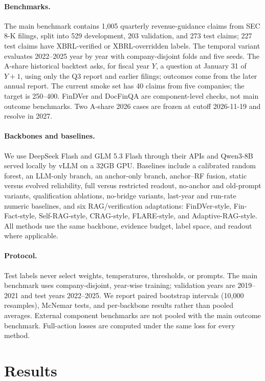 \documentclass[11pt]{article}
\begin{document}
\paragraph{Benchmarks.}
The main benchmark contains 1,005 quarterly revenue-guidance claims from SEC 8-K filings, split into 529 development, 203 validation, and 273 test claims; 227 test claims have XBRL-verified or XBRL-overridden labels. The temporal variant evaluates 2022--2025 year by year with company-disjoint folds and five seeds. The A-share historical backtest asks, for fiscal year $Y$, a question at January 31 of $Y+1$, using only the Q3 report and earlier filings; outcomes come from the later annual report. The current smoke set has 40 claims from five companies; the target is 250--400. FinDVer and DocFinQA are component-level checks, not main outcome benchmarks. Two A-share 2026 cases are frozen at cutoff 2026-11-19 and resolve in 2027.

\paragraph{Backbones and baselines.}
We use DeepSeek Flash and GLM 5.3 Flash through their APIs and Qwen3-8B served locally by vLLM on a 32GB GPU. Baselines include a calibrated random forest, an LLM-only branch, an anchor-only branch, anchor--RF fusion, static versus evolved reliability, full versus restricted readout, no-anchor and old-prompt variants, qualification ablations, no-bridge variants, last-year and run-rate numeric baselines, and six RAG/verification adaptations: FinDVer-style, Fin-Fact-style, Self-RAG-style, CRAG-style, FLARE-style, and Adaptive-RAG-style. All methods use the same backbone, evidence budget, label space, and readout where applicable.

\paragraph{Protocol.}
Test labels never select weights, temperatures, thresholds, or prompts. The main benchmark uses company-disjoint, year-wise training; validation years are 2019--2021 and test years 2022--2025. We report paired bootstrap intervals (10,000 resamples), McNemar tests, and per-backbone results rather than pooled averages. External component benchmarks are not pooled with the main outcome benchmark. Full-action losses are computed under the same loss for every method.

\section{Results}
\end{document}
